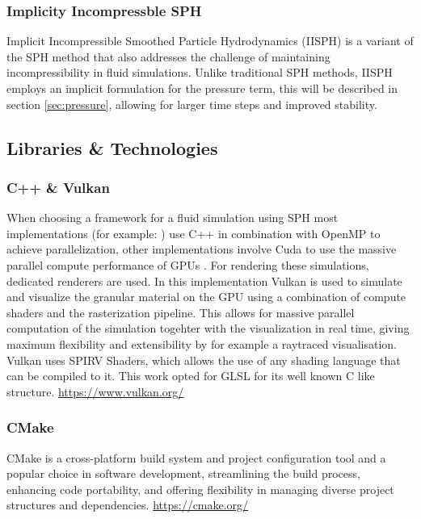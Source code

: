 \documentclass[intern]{cgMA}
\begin{document}
    \subsubsection*{Implicity Incompressble SPH} \label{sec:iisph}
    Implicit Incompressible Smoothed Particle Hydrodynamics (IISPH) is a variant of the SPH method that also addresses the challenge of maintaining incompressibility in fluid simulations. Unlike traditional SPH methods, IISPH employs an implicit formulation for the pressure term, this will be described in section \ref{sec:pressure}, allowing for larger time steps and improved stability.\cite{6570475} %

    \pagebreak
    \subsection{Libraries \& Technologies}

    \subsubsection*{C++ \& Vulkan}
    When choosing a framework for a fluid simulation using SPH most implementations (for example: \cite{splishsplash} \cite{dualsphysics}) use C++ in combination with OpenMP to achieve parallelization, other implementations involve Cuda to use the massive parallel compute performance of GPUs \cite{dualsphysics}. For rendering these simulations, dedicated renderers are used. In this implementation Vulkan is used to simulate and visualize the granular material on the GPU using a combination of compute shaders and the rasterization pipeline. This allows for massive parallel computation of the simulation togehter with the visualization in real time, giving maximum flexibility and extensibility by for example a raytraced visualisation. Vulkan uses SPIRV Shaders, which allows the use of any shading language that can be compiled to it. This work opted for GLSL for its well known C like structure. \url{https://www.vulkan.org/}

    \subsubsection*{CMake}    
    CMake is a cross-platform build system and project configuration tool and a popular choice in software development, streamlining the build process, enhancing code portability, and offering flexibility in managing diverse project structures and dependencies. \url{https://cmake.org/}
\end{document}

